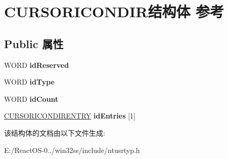\hypertarget{struct_c_u_r_s_o_r_i_c_o_n_d_i_r}{}\section{C\+U\+R\+S\+O\+R\+I\+C\+O\+N\+D\+I\+R结构体 参考}
\label{struct_c_u_r_s_o_r_i_c_o_n_d_i_r}
\subsection*{Public 属性}
\begin{DoxyCompactItemize}
\item 
\mbox{\label{struct_c_u_r_s_o_r_i_c_o_n_d_i_r_a2a064b2332fb218f1da5959f27c1fbe6}} 
W\+O\+RD {\bfseries id\+Reserved}
\item 
\mbox{\label{struct_c_u_r_s_o_r_i_c_o_n_d_i_r_aac1d88f83f83285bb611bbd58f8bbbbf}} 
W\+O\+RD {\bfseries id\+Type}
\item 
\mbox{\label{struct_c_u_r_s_o_r_i_c_o_n_d_i_r_ab2b9f62060b131c52f14943890c6997f}} 
W\+O\+RD {\bfseries id\+Count}
\item 
\mbox{\label{struct_c_u_r_s_o_r_i_c_o_n_d_i_r_a613a9daddd40ba087b5095ab45db171d}} 
\hyperlink{struct_c_u_r_s_o_r_i_c_o_n_d_i_r_e_n_t_r_y}{C\+U\+R\+S\+O\+R\+I\+C\+O\+N\+D\+I\+R\+E\+N\+T\+RY} {\bfseries id\+Entries} \mbox{[}1\mbox{]}
\end{DoxyCompactItemize}


该结构体的文档由以下文件生成\+:\begin{DoxyCompactItemize}
\item 
E\+:/\+React\+O\+S-\/0../win32ss/include/ntusrtyp.\+h\end{DoxyCompactItemize}
